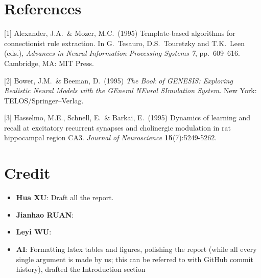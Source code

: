 \documentclass{article}
\begin{document}
\section*{References}
{
\small


[1] Alexander, J.A.\ \& Mozer, M.C.\ (1995) Template-based algorithms for
connectionist rule extraction. In G.\ Tesauro, D.S.\ Touretzky and T.K.\ Leen
(eds.), {\it Advances in Neural Information Processing Systems 7},
pp.\ 609--616. Cambridge, MA: MIT Press.


[2] Bower, J.M.\ \& Beeman, D.\ (1995) {\it The Book of GENESIS: Exploring
  Realistic Neural Models with the GEneral NEural SImulation System.}  New York:
TELOS/Springer--Verlag.


[3] Hasselmo, M.E., Schnell, E.\ \& Barkai, E.\ (1995) Dynamics of learning and
recall at excitatory recurrent synapses and cholinergic modulation in rat
hippocampal region CA3. {\it Journal of Neuroscience} {\bf 15}(7):5249-5262.
}

\section*{Credit}
\begin{itemize}
    \item \textbf{Hua XU}: Draft all the report.
    \item \textbf{Jianhao RUAN}:
    \item \textbf{Leyi WU}: 
    \item \textbf{AI}: Formatting latex tables and figures, polishing the report (while all every single argument is made by us; this can be referred to with GitHub commit history), drafted the Introduction section

\end{itemize}
\end{document}
